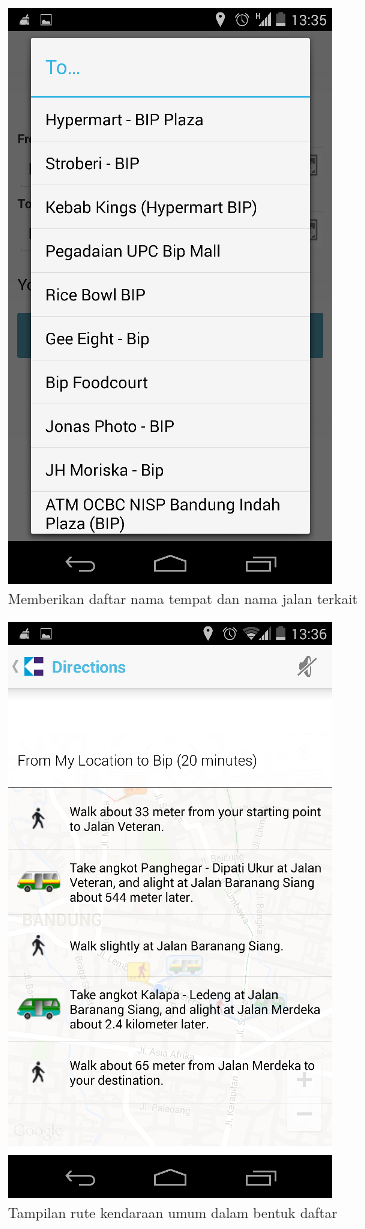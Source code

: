 \begin{figure}[h]
	\centering
		\includegraphics[scale=0.5]{Gambar/KIRI_Android/terkait}
	\caption{Memberikan daftar nama tempat dan nama jalan terkait}
	\label{fig:terkait}
\end{figure}

\begin{figure}[h]
	\centering
		\includegraphics[scale=0.5]{Gambar/KIRI_Android/tampilan_daftar}
	\caption{Tampilan rute kendaraan umum dalam bentuk daftar}
	\label{fig:daftar}
\end{figure}

